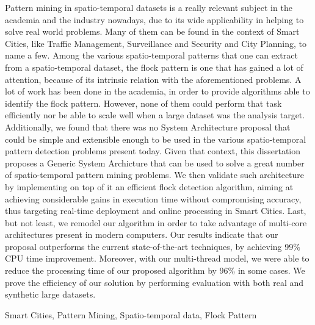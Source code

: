 Pattern mining in spatio-temporal datasets is a really relevant subject in the academia and the industry nowadays, due
to its wide applicability in helping to solve real world problems. Many of them can be found in the context of Smart
Cities, like Traffic Management, Surveillance and Security and City Planning, to name a few. Among the various
spatio-temporal patterns that one can extract from a spatio-temporal dataset, the flock pattern is one that has gained a
lot of attention, because of its intrinsic relation with the aforementioned problems. A lot of work has been done in the
academia, in order to provide algorithms able to identify the flock pattern. However, none of them could perform that
task efficiently nor be able to scale well when a large dataset was the analysis target. Additionally, we found that
there was no System Architecture proposal that could be simple and extensible enough to be used in the various
spatio-temporal pattern detection problems present today. Given that context, this dissertation proposes a Generic
System Archicture that can be used to solve a great number of spatio-temporal pattern mining problems. We then validate
such architecture by implementing on top of it an efficient flock detection algorithm, aiming at achieving considerable
gains in execution time without compromising accuracy, thus targeting real-time deployment and online processing in
Smart Cities. Last, but not least, we remodel our algorithm in order to take advantage of multi-core architectures
present in modern computers. Our results indicate that our proposal outperforms the current state-of-the-art techniques,
by achieving 99\% CPU time improvement. Moreover, with our multi-thread model, we were able to reduce the processing
time of our proposed algorithm by 96\% in some cases. We prove the efficiency of our solution by performing evaluation
with both real and synthetic large datasets.

\begin{keywords}
Smart Cities, Pattern Mining, Spatio-temporal data, Flock Pattern
\end{keywords}

